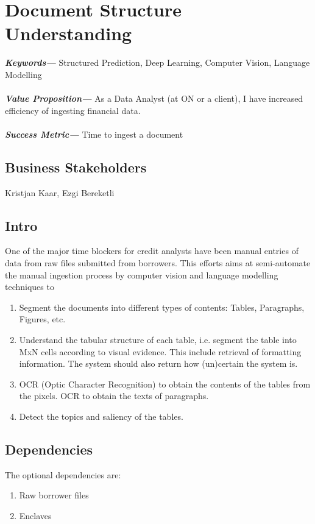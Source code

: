 \documentclass[]{article}
\providecommand{\keywords}[1]{\textbf{\textit{Keywords---}} #1}
\providecommand{\values}[1]{\textbf{\textit{Value Proposition---}} #1}
\providecommand{\successmetric}[1]{\textbf{\textit{Success Metric---}} #1}
\begin{document}
\newpage


\section{Document Structure Understanding}
\keywords{Structured Prediction, Deep Learning, Computer Vision, Language 
Modelling}
\\\\
\noindent
\values{As a Data Analyst (at ON or a client), I have increased efficiency of 
ingesting financial data.}
\\\\
\noindent
\successmetric{Time to ingest a document}
\subsection{Business Stakeholders}
Kristjan Kaar, Ezgi Bereketli 
\subsection{Intro}
One of the major time blockers for credit analysts have been manual entries of 
data from raw files submitted from borrowers. This efforts aims at 
semi-automate the manual ingestion process by computer vision and language 
modelling techniques to 

\begin{enumerate}
    \item Segment the documents into different types of contents: Tables, 
    Paragraphs, Figures, etc.
    \item Understand the tabular structure of each table, i.e. segment the 
    table into MxN 
    cells according to visual evidence. This include retrieval of formatting 
    information. The system should also return how (un)certain the system is.
    \item OCR (Optic Character Recognition) to obtain the contents of the 
    tables from the pixels. OCR to obtain the texts of paragraphs.
    \item Detect the topics and saliency of the tables.
\end{enumerate} 

\subsection{Dependencies}

The optional dependencies are:
\begin{enumerate}
    \item Raw borrower files
    \item Enclaves \cite{ppdp2019on}
\end{enumerate}
\end{document}
